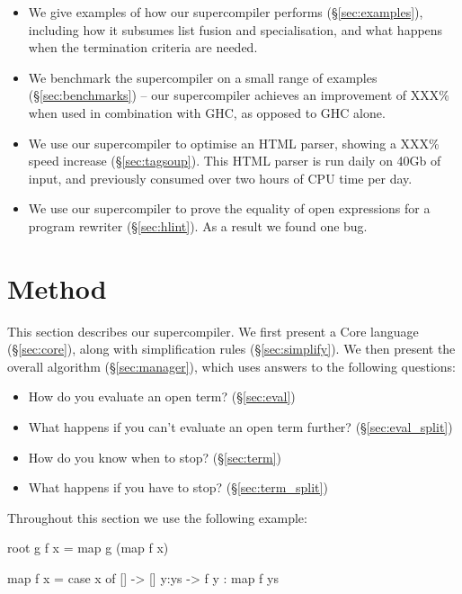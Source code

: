 \documentclass[draft]{sigplanconf}
\newcommand{\unknown}{XXX}
\begin{document}
\begin{itemize}
\item We give examples of how our supercompiler performs (\S\ref{sec:examples}), including how it subsumes list fusion and specialisation, and what happens when the termination criteria are needed.
\item We benchmark the supercompiler on a small range of examples (\S\ref{sec:benchmarks}) -- our supercompiler achieves an improvement of \unknown{}\% when used in combination with GHC, as opposed to GHC alone.
\item We use our supercompiler to optimise an HTML parser, showing a \unknown{}\% speed increase (\S\ref{sec:tagsoup}). This HTML parser is run daily on 40Gb of input, and previously consumed over two hours of CPU time per day.
\item We use our supercompiler to prove the equality of open expressions for a program rewriter (\S\ref{sec:hlint}). As a result we found one bug.
\end{itemize}

\section{Method}
\label{sec:method}

This section describes our supercompiler. We first present a Core language (\S\ref{sec:core}), along with simplification rules (\S\ref{sec:simplify}). We then present the overall algorithm (\S\ref{sec:manager}), which uses answers to the following questions:

\begin{itemize}
\item How do you evaluate an open term? (\S\ref{sec:eval})
\item What happens if you can't evaluate an open term further? (\S\ref{sec:eval_split})
\item How do you know when to stop? (\S\ref{sec:term})
\item What happens if you have to stop? (\S\ref{sec:term_split})
\end{itemize}

\noindent Throughout this section we use the following example:

\begin{code}
root g f x = map g (map f x)

map f x = case  x of
                []    -> []
                y:ys  -> f y : map f ys
\end{code}
\end{document}
